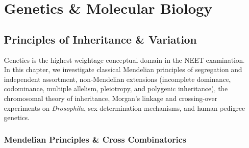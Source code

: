 \documentclass[10pt,twoside,openright]{book}
\begin{document}
\part{Genetics \& Molecular Biology}

\chapter{Principles of Inheritance \& Variation}

Genetics is the highest-weightage conceptual domain in the NEET examination. In this chapter, we investigate classical Mendelian principles of segregation and independent assortment, non-Mendelian extensions (incomplete dominance, codominance, multiple allelism, pleiotropy, and polygenic inheritance), the chromosomal theory of inheritance, Morgan's linkage and crossing-over experiments on \textit{Drosophila}, sex determination mechanisms, and human pedigree genetics.

\section{Mendelian Principles \& Cross Combinatorics}
\end{document}
